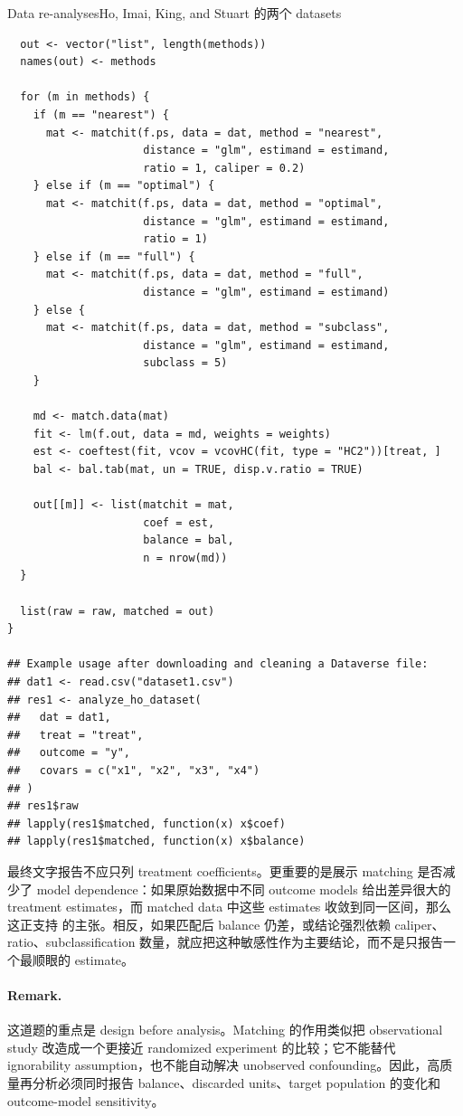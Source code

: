 \begin{exercisesolution}{Data re-analyses}{Ho, Imai, King, and Stuart 的两个 datasets}
\begin{lstlisting}
  out <- vector("list", length(methods))
  names(out) <- methods

  for (m in methods) {
    if (m == "nearest") {
      mat <- matchit(f.ps, data = dat, method = "nearest",
                     distance = "glm", estimand = estimand,
                     ratio = 1, caliper = 0.2)
    } else if (m == "optimal") {
      mat <- matchit(f.ps, data = dat, method = "optimal",
                     distance = "glm", estimand = estimand,
                     ratio = 1)
    } else if (m == "full") {
      mat <- matchit(f.ps, data = dat, method = "full",
                     distance = "glm", estimand = estimand)
    } else {
      mat <- matchit(f.ps, data = dat, method = "subclass",
                     distance = "glm", estimand = estimand,
                     subclass = 5)
    }

    md <- match.data(mat)
    fit <- lm(f.out, data = md, weights = weights)
    est <- coeftest(fit, vcov = vcovHC(fit, type = "HC2"))[treat, ]
    bal <- bal.tab(mat, un = TRUE, disp.v.ratio = TRUE)

    out[[m]] <- list(matchit = mat,
                     coef = est,
                     balance = bal,
                     n = nrow(md))
  }

  list(raw = raw, matched = out)
}

## Example usage after downloading and cleaning a Dataverse file:
## dat1 <- read.csv("dataset1.csv")
## res1 <- analyze_ho_dataset(
##   dat = dat1,
##   treat = "treat",
##   outcome = "y",
##   covars = c("x1", "x2", "x3", "x4")
## )
## res1$raw
## lapply(res1$matched, function(x) x$coef)
## lapply(res1$matched, function(x) x$balance)
\end{lstlisting}

最终文字报告不应只列 treatment coefficients。更重要的是展示 matching 是否减少了 model dependence：如果原始数据中不同 outcome models 给出差异很大的 treatment estimates，而 matched data 中这些 estimates 收敛到同一区间，那么这正支持 \citet{ho2007matching} 的主张。相反，如果匹配后 balance 仍差，或结论强烈依赖 caliper、ratio、subclassification 数量，就应把这种敏感性作为主要结论，而不是只报告一个最顺眼的 estimate。

\paragraph{Remark.}
这道题的重点是 design before analysis。Matching 的作用类似把 observational study 改造成一个更接近 randomized experiment 的比较；它不能替代 ignorability assumption，也不能自动解决 unobserved confounding。因此，高质量再分析必须同时报告 balance、discarded units、target population 的变化和 outcome-model sensitivity。
\end{exercisesolution}
